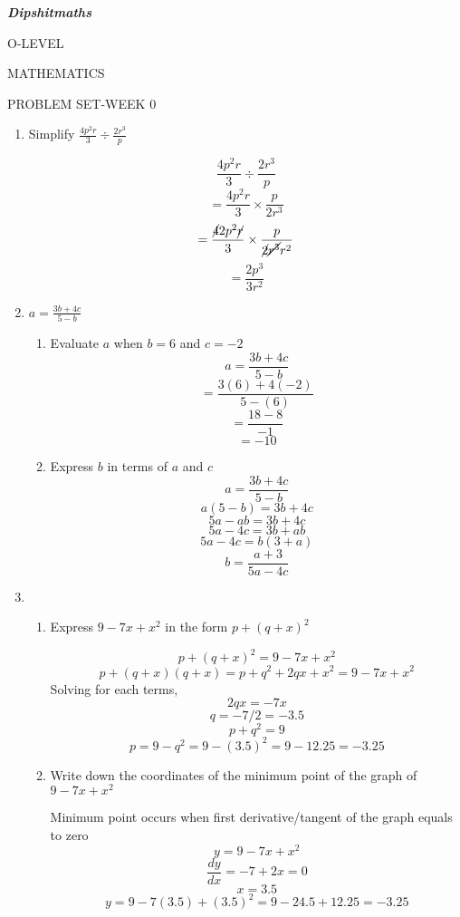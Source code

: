 \documentclass{article}
\begin{document}
	

\textbf{\textit{Dipshitmaths}}

\begin{flushright}
	O-LEVEL 
	
	MATHEMATICS
	
	PROBLEM SET-WEEK 0
\end{flushright}

\begin{enumerate}
	\item  Simplify $\frac{4p^2r}{3}\div\frac{2r^3}{p}$
	
	\[
		\frac{4p^2r}{3}\div\frac{2r^3}{p}
	\]
	\[
		= \frac{4p^2r}{3}\times\frac{p}{2r^3}
	\]
	\[
		= \frac{\cancel{4}2p^2\cancel{r}}{3}\times\frac{p}{\cancel{2}\cancel{r^3}r^2}
	\]
	\[
		= \frac{2p^3}{3r^2}
	\]
		
		
	\item $a=\frac{3b+4c}{5-b}$
		\begin{enumerate}
			\item Evaluate $a$ when $b=6$ and $c=-2$
			\[
				a = \frac{3b+4c}{5-b}
			\]
			\[
				= \frac{3(6)+4(-2)}{5-(6)}
			\]
			\[
				= \frac{18-8}{-1} 
			\]
			\[
				= -10
			\]
			
			\item Express $b$ in terms of $a$ and $c$
			\[
				a = \frac{3b+4c}{5-b}
			\]
			\[
				a(5-b) = 3b+4c
			\]
			\[
				5a-ab = 3b+4c
			\]
			\[
				5a-4c = 3b+ab
			\]
			\[
				5a-4c = b(3+a)
			\]
			\[
				b = \frac{a+3}{5a-4c}
			\]
		\end{enumerate}

	\item 
		\begin{enumerate}
			\item Express $9-7x+x^2$ in the form $p+(q+x)^2$
			
			\[
				p+(q+x)^2 = 9-7x+x^2
			\]
			\[
				p + (q+x)(q+x) = p + q^2 + 2qx + x^2 = 9-7x+x^2
			\]
			Solving for each terms,	
			\[
				2qx = -7x
			\]
			\[
				q = -7/2 = -3.5
			\]
			\[
				p + q^2 = 9
			\]
			\[
				p = 9 - q^2 = 9 - (3.5)^2 = 9 - 12.25 = -3.25
			\]
			
			
			\item Write down the coordinates of the minimum point of the graph of $9-7x+x^2$
			
			Minimum point occurs when first derivative/tangent of the graph equals to zero
			\[
				y = 9-7x+x^2
			\]
			\[
				\frac{dy}{dx} = -7 + 2x = 0			
			\]
			\[
				x = 3.5
			\]
			\[
				y = 9 - 7(3.5) + (3.5)^2 = 9 - 24.5 + 12.25 = -3.25
			\]
			

\end{enumerate}
\end{enumerate}
\end{document}
